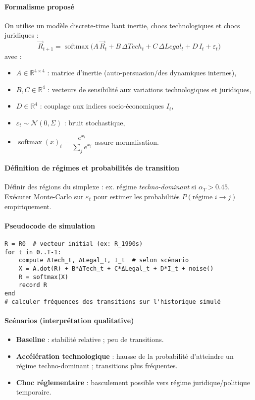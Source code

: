 \documentclass[11pt,a4paper]{article}
\begin{document}
\paragraph{Formalisme proposé}
On utilise un modèle discrete-time liant inertie, chocs technologiques et chocs juridiques :
\[
\vec R_{t+1} = \operatorname{softmax}\!\Big( A\,\vec R_t + B\,\Delta\!Tech_t + C\,\Delta\!Legal_t + D\,I_t + \varepsilon_t\Big)
\]
avec :
\begin{itemize}[noitemsep]
  \item $A\in\mathbb{R}^{4\times4}$ : matrice d'inertie (auto-persuasion/des dynamiques internes),
  \item $B,C\in\mathbb{R}^{4}$ : vecteurs de sensibilité aux variations technologiques et juridiques,
  \item $D\in\mathbb{R}^{4}$ : couplage aux indices socio-économiques $I_t$,
  \item $\varepsilon_t\sim\mathcal{N}(0,\Sigma)$ : bruit stochastique,
  \item $\operatorname{softmax}(x)_i=\dfrac{e^{x_i}}{\sum_j e^{x_j}}$ assure normalisation.
\end{itemize}

\paragraph{Définition de régimes et probabilités de transition}
Définir des régions du simplexe : ex. régime \emph{techno-dominant} si $\alpha_T>0.45$. Exécuter Monte-Carlo sur $\varepsilon_t$ pour estimer les probabilités $P(\text{régime }i\to j)$ empiriquement.

\paragraph{Pseudocode de simulation}
\begin{verbatim}
R = R0  # vecteur initial (ex: R_1990s)
for t in 0..T-1:
    compute ΔTech_t, ΔLegal_t, I_t  # selon scénario
    X = A.dot(R) + B*ΔTech_t + C*ΔLegal_t + D*I_t + noise()
    R = softmax(X)
    record R
end
# calculer fréquences des transitions sur l'historique simulé
\end{verbatim}

\paragraph{Scénarios (interprétation qualitative)}
\begin{itemize}[noitemsep]
  \item \textbf{Baseline} : stabilité relative ; peu de transitions.
  \item \textbf{Accélération technologique} : hausse de la probabilité d'atteindre un régime techno-dominant ; transitions plus fréquentes.
  \item \textbf{Choc réglementaire} : basculement possible vers régime juridique/politique temporaire.
\end{itemize}
\end{document}
